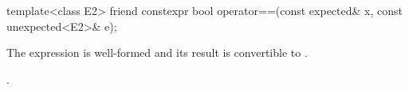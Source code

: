 %
\begin{itemdecl}
template<class E2>
friend constexpr bool operator==(const expected& x, const unexpected<E2>& e);
\end{itemdecl}

\begin{itemdescr}
\pnum
\mandates
The expression  is well-formed and its result is convertible to .

\pnum
\returns
{}.
\end{itemdescr}
